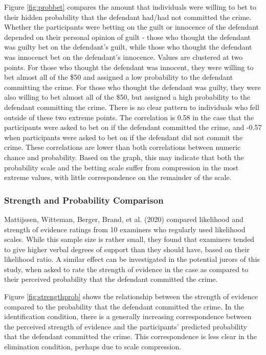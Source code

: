 \documentclass[print]{nuthesis}
\begin{document}
Figure \ref{fig:probbet} compares the amount that individuals were willing to bet to their hidden probability that the defendant had/had not committed the crime.
Whether the participants were betting on the guilt or innocence of the defendant depended on their personal opinion of guilt - those who thought the defendant was guilty bet on the defendant's guilt, while those who thought the defendant was innocenct bet on the defendant's innocence.
Values are clustered at two points.
For those who thought the defendant was innocent, they were willing to bet almost all of the \$50 and assigned a low probability to the defendant committing the crime.
For those who thought the defendant was guilty, they were also willing to bet almost all of the \$50, but assigned a high probability to the defendant committing the crime.
There is no clear pattern to individuals who fell outside of these two extreme points.
The correlation is 0.58 in the case that the participants were asked to bet on if the defendant committed the crime, and -0.57 when participants were asked to bet on if the defendant did not commit the crime.
These correlations are lower than both correlations between numeric chance and probability.
Based on the graph, this may indicate that both the probability scale and the betting scale suffer from compression in the most extreme values, with little correspondence on the remainder of the scale.

\hypertarget{strength-and-probability-comparison}{%
\subsubsection{Strength and Probability Comparison}\label{strength-and-probability-comparison}}

Mattijssen, Witteman, Berger, Brand, et al. (2020) compared likelihood and strength of evidence ratings from 10 examiners who regularly used likelihood scales.
While this sample size is rather small, they found that examiners tended to give higher verbal degrees of support than they should have, based on their likelihood ratio.
A similar effect can be investigated in the potential jurors of this study, when asked to rate the strength of evidence in the case as compared to their perceived probability that the defendant committed the crime.

Figure \ref{fig:strengthprob} shows the relationship between the strength of evidence compared to the probability that the defendant committed the crime.
In the identification condition, there is a generally increasing correspondence between the perceived strength of evidence and the participants' predicted probability that the defendant committed the crime.
This correspondence is less clear in the elimination condition, perhaps due to scale compression.
\end{document}
